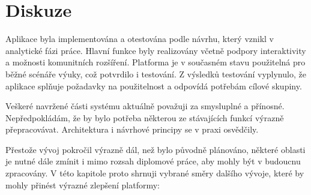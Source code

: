\chapter{Diskuze}\label{text:diskuze}

Aplikace byla implementována a otestována podle návrhu, který vznikl v analytické fázi práce.
Hlavní funkce byly realizovány včetně podpory interaktivity a možnosti komunitních rozšíření.
Platforma je v současném stavu použitelná pro běžné scénáře výuky, což potvrdilo i testování.
Z výsledků testování vyplynulo, že aplikace splňuje požadavky na použitelnost a odpovídá potřebám cílové skupiny.

Veškeré navržené části systému aktuálně považuji za smysluplné a přínosné. 
Nepředpokládám, že by bylo potřeba některou ze stávajících funkcí výrazně přepracovávat. 
Architektura i návrhové principy se v praxi osvědčily.

Přestože vývoj pokročil výrazně dál, než bylo původně plánováno, některé oblasti je nutné dále zmínit i mimo rozsah diplomové práce, aby mohly být v budoucnu zpracovány. 
V této kapitole proto shrnuji vybrané směry dalšího vývoje, které by mohly přinést výrazné zlepšení platformy:

